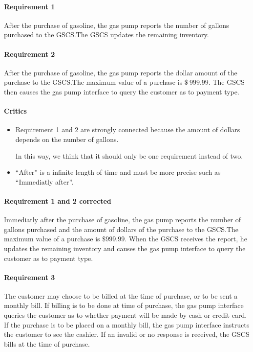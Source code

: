 
\paragraph{Requirement 1} After the purchase of gasoline, the gas pump
reports the number of gallons purchased to the GSCS.\@ The GSCS updates the
remaining inventory.

\paragraph{Requirement 2} After the purchase of gasoline, the gas pump
reports the dollar amount of the purchase to the GSCS.\@ The maximum value of
a purchase is $\$~999.99$. The GSCS then causes the gas pump interface to
query the customer as to payment type.

\begin{framed}
    \paragraph{Critics}
    \begin{itemize}
        \item Requirement 1 and 2 are strongly connected because the
            amount of dollars depends on the number of gallons.

            In this way, we think that it should only be one
            requirement instead of two.

        \item \enquote{After} is a infinite length of time and must be more
            precise such as \enquote{Immediatly after}.
    \end{itemize}

    \paragraph{Requirement 1 and 2 corrected} Immediatly after the purchase of
    gasoline, the gas pump reports the number of gallons purchased and the
    amount of dollars of the purchase to the GSCS.\@ The maximum value of
    a purchase is $\$999.99$.
    When the GSCS receives the report, he updates the remaining
    inventory and causes the gas pump interface to query the customer as to
    payment type.
\end{framed}

\paragraph{Requirement 3} The customer may choose to be billed at the time
of purchase, or to be sent a monthly bill. If billing is to be done at time
of purchase, the gas pump interface queries the customer as to whether
payment will be made by cash or credit card. If the purchase is to be placed
on a monthly bill, the gas pump interface instructs the customer to see the
cashier. If an invalid or no response is received, the GSCS bills at the
time of purchase.

